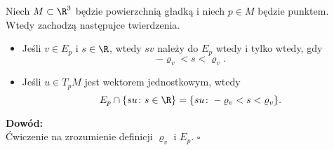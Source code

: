 \begin{frame}

\begin{lemat}
Niech $M\subset \R^3$ będzie powierzchnią gładką i niech $p\in M$ będzie punktem. Wtedy zachodzą następujce twierdzenia.
\begin{itemize}
\item Jeśli $v\in E_p$ i $s\in \R$, wtedy $sv$ należy do $E_p$ wtedy i tylko wtedy, gdy
\[-\varrho_v<s<\varrho_v.\]
\pause\item Jeśli $u\in T_pM$ jest wektorem jednostkowym, wtedy 
\[E_p\cap \{su\colon s\in \R\}=\{su\colon -\varrho_v<s<\varrho_v\}.\]
\end{itemize}

\end{lemat}
\pause \textcolor{ared}{\textbf{Dowód:}}\\
Ćwiczenie na zrozumienie definicji $\varrho_v$ i $E_p$.
\hfill $\square$
\end{frame}

